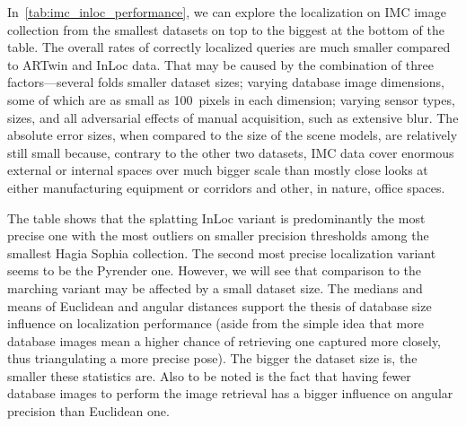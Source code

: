 In~\cref{tab:imc_inloc_performance}, we can explore the localization on IMC
image collection from the smallest datasets on top to the biggest at the bottom of the
table. The overall rates of correctly localized queries are much smaller
compared to ARTwin and InLoc data. That may be caused by the combination of
three factors---several folds smaller dataset sizes; varying database image
dimensions, some of which are as small as 100~pixels in each dimension; varying
sensor types, sizes, and all adversarial effects of manual acquisition, such as
extensive blur. The absolute error sizes, when compared to the size of the
scene models, are relatively still small because, contrary to the other two
datasets, IMC data cover enormous external or internal spaces over much
bigger scale than mostly close looks at either manufacturing equipment or
corridors and other, in nature, office spaces.

The table shows that the splatting InLoc variant is predominantly the
most precise one with the most outliers on smaller precision thresholds
among the smallest Hagia Sophia collection. The second most precise
localization variant seems to be the Pyrender one. However, we will see that
comparison to the marching variant may be affected by a small dataset
size. The medians and means of Euclidean and angular distances support the
thesis of database size influence on localization performance (aside from the
simple idea that more database images mean a higher chance of retrieving one
captured more closely, thus triangulating a more precise pose). The bigger
the dataset size is, the smaller these statistics are. Also to be noted is the
fact that having fewer database images to perform the image retrieval has a
bigger influence on angular precision than Euclidean one.\\



